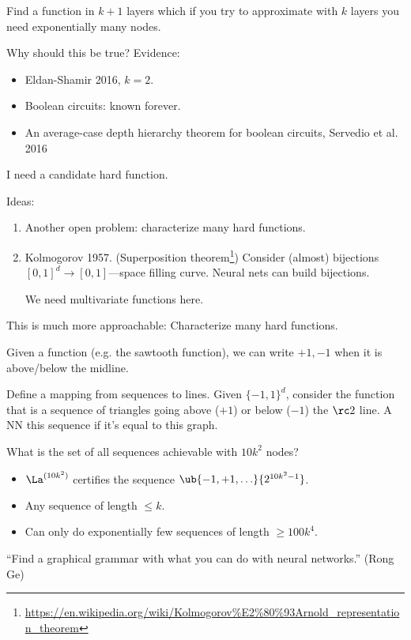 Find a function in $k+1$ layers which if you try to approximate with $k$ layers you need exponentially many nodes.

Why should this be true?  Evidence:
\begin{itemize}
\item
Eldan-Shamir 2016, $k=2$. \cite{eldan2015power}
\item
Boolean circuits: known forever.
\item
An average-case depth hierarchy theorem for boolean circuits, Servedio et al. 2016 \cite{rossman2015average}
\end{itemize}

I need a candidate hard function.

Ideas:
\begin{enumerate}
\item
Another open problem: characterize many hard functions.
\item
Kolmogorov 1957. (Superposition theorem\footnote{\url{https://en.wikipedia.org/wiki/Kolmogorov\%E2\%80\%93Arnold_representation_theorem}}) Consider (almost) bijections $[0,1]^d\to [0,1]$---space filling curve. %
Neural nets can build bijections.

We need multivariate functions here.
\end{enumerate}

This is much more approachable: Characterize many hard functions. 

Given a function (e.g. the sawtooth function), we can write $+1,-1$ when it is above/below the midline.

Define a mapping from sequences to lines. Given $\{-1,1\}^d$, consider the function that is a sequence of triangles going above ($+1$) or below ($-1$) the $\rc2$ line. A NN  this sequence if it's equal to this graph.


What is the set of all sequences achievable with $10k^2$ nodes?
\begin{itemize}
\item
$\La^{(10k^2)}$ certifies the sequence $\ub{-1,+1,\ldots}{2^{10k^2 -1}}$.
\item
Any sequence of length $\le k$.
\item Can only do exponentially few sequences of length $\ge 100k^4$.
\end{itemize}
``Find a graphical grammar with what you can do with neural networks.'' (Rong Ge)

